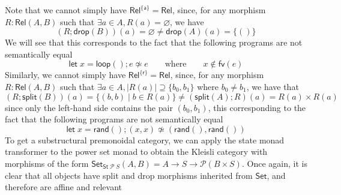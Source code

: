 \documentclass[acmsmall,screen,review]{acmart}
\newcommand{\mc}[1]{\ensuremath{\mathcal{#1}}}
\newcommand{\ms}[1]{\ensuremath{\mathsf{#1}}}
\begin{document}
Note that we cannot simply have \(\ms{Rel}^{\{\ms{a}\}} = \ms{Rel}\), since, for any morphism \(R: \ms{Rel}(A, B)\) such that \(\exists a \in A, R(a) = \varnothing\), we have
\begin{equation}
  (R;\ms{drop}(B))(a) = \varnothing \neq \ms{drop}(A)(a) = \{()\}
\end{equation}
We will see that this corresponds to the fact that the following programs are not semantically equal
\begin{equation}
  \ms{let}\;x = \ms{loop}(); e \not\simeq e \qquad \text{where} \qquad x \notin \ms{fv}(e)
\end{equation}
Similarly, we cannot simply have \(\ms{Rel}^{\{\ms{r}\}} = \ms{Rel}\), since, for any morphism \(R: \ms{Rel}(A, B)\) such that \(\exists a \in A, |R(a)| \supseteq \{b_0, b_1\}\) where \(b_0 \neq b_1\), we have that
\begin{equation}
  (R;\ms{split}(B))(a) = \{(b, b) \mid b \in R(a)\} \neq (\ms{split}(A);R)(a) = R(a) \times R(a) 
\end{equation}
since only the left-hand side contains the pair \((b_0, b_1)\), this corresponding to the fact that the following programs are not semantically equal
\begin{equation}
  \ms{let}\;x = \ms{rand}(); (x, x) \not\simeq (\ms{rand}(), \ms{rand}())
\end{equation}
To get a substructural premonoidal category, we can apply the state monad transformer to the power set monad to obtain the Kleisli category with morphisms of the form \(\ms{Set}_{\ms{St}\;\mc{P}\;S}(A, B) = A \to S \to \mc{P}(B \times S)\). Once again, it is clear that all objects have split and drop morphisms inherited from \(\ms{Set}\), and therefore are affine and relevant
\end{document}
